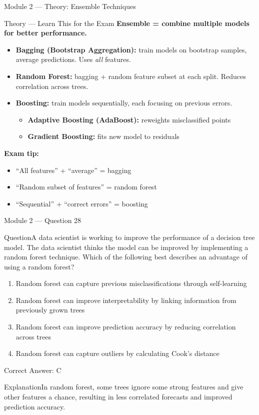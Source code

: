 \documentclass[aspectratio=169,10pt]{beamer}
\newcommand{\question}[1]{\begin{block}{Question}#1\end{block}}
\newcommand{\options}[4]{%
	\begin{enumerate}[label=\Alph*.,leftmargin=*]
		\item #1
		\item #2
		\item #3
		\item #4
	\end{enumerate}
}
\newcommand{\answerbox}[1]{\begin{exampleblock}{Correct Answer: #1}\end{exampleblock}}
\newcommand{\explain}[1]{\begin{block}{Explanation}#1\end{block}}
\newcommand{\theory}[1]{%
	\begin{block}{Theory --- Learn This for the Exam}
		\small #1
	\end{block}
}
\begin{document}
	\begin{frame}{Module 2 --- Theory: Ensemble Techniques}
		\theory{
			\textbf{Ensemble = combine multiple models for better performance.}
			\begin{itemize}
				\item \textbf{Bagging (Bootstrap Aggregation):} train models on bootstrap samples, average predictions. Uses \emph{all} features.
				\item \textbf{Random Forest:} bagging + random feature subset at each split. Reduces correlation across trees.
				\item \textbf{Boosting:} train models sequentially, each focusing on previous errors.
				\begin{itemize}
					\item \textbf{Adaptive Boosting (AdaBoost):} reweights misclassified points
					\item \textbf{Gradient Boosting:} fits new model to residuals
				\end{itemize}
			\end{itemize}
			\textbf{Exam tip:}
			\begin{itemize}
				\item ``All features'' + ``average'' = bagging
				\item ``Random subset of features'' = random forest
				\item ``Sequential'' + ``correct errors'' = boosting
			\end{itemize}
		}
	\end{frame}
	
	\begin{frame}{Module 2 --- Question 28}
		\question{A data scientist is working to improve the performance of a decision tree model. The data scientist thinks the model can be improved by implementing a random forest technique. Which of the following best describes an advantage of using a random forest?}
		\options{Random forest can capture previous misclassifications through self-learning}{Random forest can improve interpretability by linking information from previously grown trees}{Random forest can improve prediction accuracy by reducing correlation across trees}{Random forest can capture outliers by calculating Cook's distance}
		\answerbox{C}
		\explain{In random forest, some trees ignore some strong features and give other features a chance, resulting in less correlated forecasts and improved prediction accuracy.}
	\end{frame}
	
\end{document}
